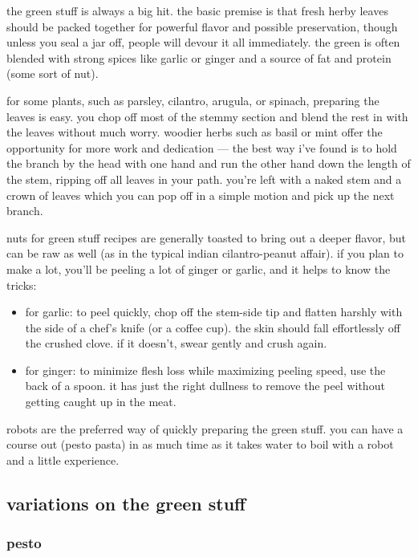 the green stuff is always a big hit. the basic premise is that fresh herby 
leaves should be packed together for powerful flavor and possible preservation, 
though unless you seal a jar off, people will devour it all immediately. the 
green is often blended with strong spices like garlic or ginger and a source of 
fat and protein (some sort of nut).

for some plants, such as parsley, cilantro, arugula, or spinach, preparing the 
leaves is easy. you chop off most of the stemmy section and blend the rest in 
with the leaves without much worry. woodier herbs such as basil or mint offer 
the opportunity for more work and dedication --- the best way i've found is to 
hold the branch by the head with one hand and run the other hand down the 
length of the stem, ripping off all leaves in your path. you're left with a 
naked stem and a crown of leaves which you can pop off in a simple motion and 
pick up the next branch.

nuts for green stuff recipes are generally toasted to bring out a deeper 
flavor, but can be raw as well (as in the typical indian cilantro-peanut 
affair). if you plan to make a lot, you'll be peeling a lot of ginger or 
garlic, and it helps to know the tricks:

\begin{itemize}
  \item for garlic: to peel quickly, chop off the stem-side tip and flatten 
  harshly with the side of a chef's knife (or a coffee cup). the skin should 
  fall effortlessly off the crushed clove. if it doesn't, swear gently and 
  crush again.

  \item for ginger: to minimize flesh loss while maximizing peeling speed, use 
  the back of a spoon. it has just the right dullness to remove the peel 
  without getting caught up in the meat.
\end{itemize}

robots are the preferred way of quickly preparing the green stuff. you can have 
a course out (pesto pasta) in as much time as it takes water to boil with a 
robot and a little experience.

\subsection{variations on the green stuff}

\subsubsection{pesto}

